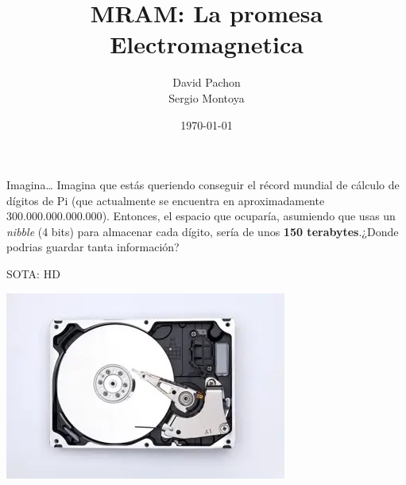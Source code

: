 \documentclass[aspectratio=169]{beamer}
\title[MRAM Pros \& Cons]{MRAM: La promesa Electromagnetica}
\author[Pachon D.]{David Pachon \\ Sergio Montoya}
\date{\today}
\begin{document}


\begin{frame}[plain]
    \titlepage
\end{frame}






\begin{frame}{Imagina\ldots}
    Imagina que estás queriendo conseguir el récord mundial de cálculo de dígitos de Pi (que actualmente se encuentra en aproximadamente $300.000.000.000.000$). Entonces, el espacio que ocuparía, asumiendo que usas un \textit{nibble} (4 bits) para almacenar cada dígito, sería de unos \textbf{150 terabytes}.¿Donde podrias guardar tanta información?
\end{frame}

\begin{frame}{SOTA: HD}
    \begin{center}
    \includegraphics[scale=.75]{fig/hard-disk-drive.jpeg}
    \end{center}
\end{frame}
\end{document}
